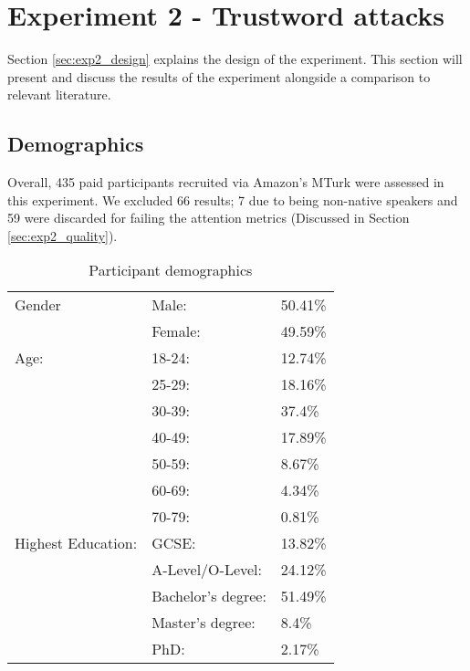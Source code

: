 

\newpage

\section{Experiment 2 - Trustword attacks}
\label{sec:exp2}

Section \ref{sec:exp2_design} explains the design of the experiment. This section will present and discuss the results of the experiment alongside a comparison to relevant literature.

\subsection*{Demographics}
Overall, 435 paid participants recruited via Amazon's MTurk were assessed in this experiment. We excluded 66 results; 7 due to being non-native speakers and 59 were discarded for failing the attention metrics (Discussed in Section \ref{sec:exp2_quality}).

\begin{table}[h]
    \centering
    \begin{tabular}{|l|ll|}
        \hline
        Gender & Male: & 50.41\% \\
               & Female: & 49.59\% \\
        \hline
        Age:   & 18-24: & 12.74\% \\ 
               & 25-29: & 18.16\% \\ 
               & 30-39: & 37.4\% \\ 
               & 40-49: & 17.89\% \\ 
               & 50-59: & 8.67\% \\ 
               & 60-69: & 4.34\% \\ 
               & 70-79: & 0.81\% \\ 

        \hline
        Highest Education:  
        & GCSE:                 & 13.82\%  \\
        & A-Level/O-Level:      & 24.12\% \\
        & Bachelor's degree:    & 51.49\% \\
        & Master's degree:      & 8.4\% \\ 
        & PhD:                  & 2.17\% \\
        \hline

    \end{tabular}
    \caption{Participant demographics}
    \label{tab:exp2_demo}
\end{table}

